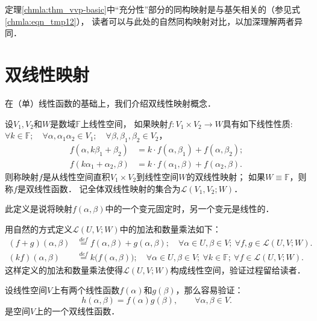 定理\ref{chmla:thm_vvp-basic}中“充分性”部分的同构映射是与基矢相关的（参见式\eqref{chmla:eqn_tmp12}），
读者可以与此处的自然同构映射对比，以加深理解两者异同．




\section{双线性映射}\label{chmla:sec_double-linear-map}
在（单）线性函数的基础上，我们介绍双线性映射概念．
\begin{definition}\label{chmla:def_bilinear-fun}
    设$V_1, V_2$和$W$是数域$\mathbb{F}$上线性空间，
    如果映射$f:V_1 \times V_2 \to W$具有如下线性性质:
    $\forall k \in \mathbb{F}; \quad \forall \alpha, \alpha_1 \alpha_2 \in V_1;
     \quad \forall \beta , \beta_1, \beta_2 \in V_2 $，
    \begin{align*}
        f(\alpha, k\beta_1+ \beta_2)&= k\cdot f(\alpha, \beta_1) + f(\alpha,\beta_2); \\
        f(k\alpha_1+\alpha_2, \beta)&= k\cdot f(\alpha_1, \beta) + f(\alpha_2,\beta).
    \end{align*}
    则称映射$f$是从线性空间直积$V_1 \times V_2 $到线性空间$W$的{\heiti 双线性映射}；
    如果$W\equiv \mathbb{F}$，则称$f$是{\heiti 双线性函数}．
    记全体双线性映射的集合为$\mathscr{L}(V_1,V_2;W)$．
\end{definition}
此定义是说将映射$f(\alpha,\beta)$中的一个变元固定时，另一个变元是线性的．

用自然的方式定义$\mathscr{L}(U,V;W)$中的加法和数量乘法如下：
\begin{align*}
    (f+g)(\alpha,\beta)  &\overset{def}{=}  f(\alpha,\beta)+g(\alpha,\beta); \quad
    \forall \alpha \in U, \beta \in V; \ \forall f,g \in \mathscr{L}(U,V;W) .  \\
    (k f) (\alpha,\beta) &\overset{def}{=}  k \bigl( f(\alpha,\beta)\bigr); \quad
    \forall \alpha \in U,  \beta \in V;\ \forall k \in \mathbb{F}; \ \forall f \in \mathscr{L}(U,V;W) .
\end{align*}
这样定义的加法和数量乘法使得$\mathscr{L}(U,V;W)$构成线性空间，验证过程留给读者．

\begin{example}\label{chmla:exm_hfg}
    设线性空间$V$上有两个线性函数$f(\alpha)$和$g(\beta)$，那么容易验证：
    \begin{equation}
        h(\alpha,\beta) = f(\alpha) g(\beta), \qquad \forall \alpha,\beta \in V.
    \end{equation}
    是空间$V$上的一个双线性函数．
\end{example}

